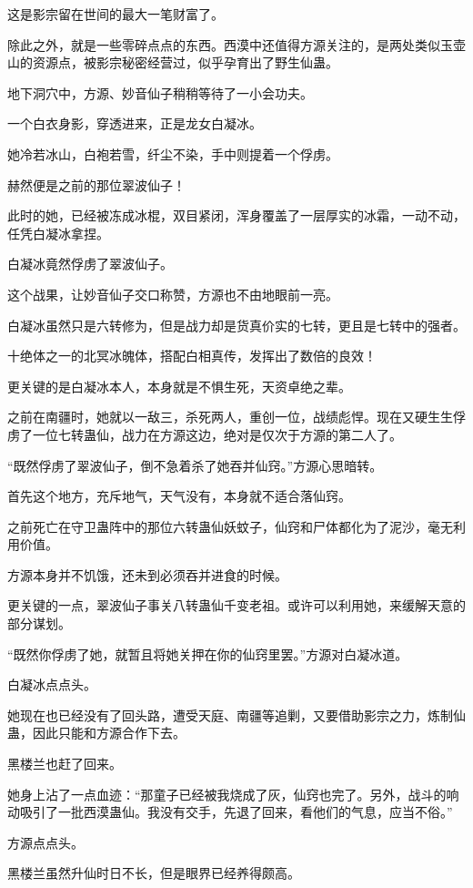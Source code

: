 \begin{this_body}
这是影宗留在世间的最大一笔财富了。

除此之外，就是一些零碎点点的东西。西漠中还值得方源关注的，是两处类似玉壶山的资源点，被影宗秘密经营过，似乎孕育出了野生仙蛊。

地下洞穴中，方源、妙音仙子稍稍等待了一小会功夫。

一个白衣身影，穿透进来，正是龙女白凝冰。

她冷若冰山，白袍若雪，纤尘不染，手中则提着一个俘虏。

赫然便是之前的那位翠波仙子！

此时的她，已经被冻成冰棍，双目紧闭，浑身覆盖了一层厚实的冰霜，一动不动，任凭白凝冰拿捏。

白凝冰竟然俘虏了翠波仙子。

这个战果，让妙音仙子交口称赞，方源也不由地眼前一亮。

白凝冰虽然只是六转修为，但是战力却是货真价实的七转，更且是七转中的强者。

十绝体之一的北冥冰魄体，搭配白相真传，发挥出了数倍的良效！

更关键的是白凝冰本人，本身就是不惧生死，天资卓绝之辈。

之前在南疆时，她就以一敌三，杀死两人，重创一位，战绩彪悍。现在又硬生生俘虏了一位七转蛊仙，战力在方源这边，绝对是仅次于方源的第二人了。

“既然俘虏了翠波仙子，倒不急着杀了她吞并仙窍。”方源心思暗转。

首先这个地方，充斥地气，天气没有，本身就不适合落仙窍。

之前死亡在守卫蛊阵中的那位六转蛊仙妖蚊子，仙窍和尸体都化为了泥沙，毫无利用价值。

方源本身并不饥饿，还未到必须吞并进食的时候。

更关键的一点，翠波仙子事关八转蛊仙千变老祖。或许可以利用她，来缓解天意的部分谋划。

“既然你俘虏了她，就暂且将她关押在你的仙窍里罢。”方源对白凝冰道。

白凝冰点点头。

她现在也已经没有了回头路，遭受天庭、南疆等追剿，又要借助影宗之力，炼制仙蛊，因此只能和方源合作下去。

黑楼兰也赶了回来。

她身上沾了一点血迹：“那童子已经被我烧成了灰，仙窍也完了。另外，战斗的响动吸引了一批西漠蛊仙。我没有交手，先退了回来，看他们的气息，应当不俗。”

方源点点头。

黑楼兰虽然升仙时日不长，但是眼界已经养得颇高。


\end{this_body}
